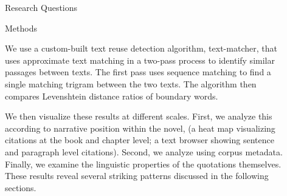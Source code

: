\documentclass[final]{beamer}
\newlength{\sepwid}
\newlength{\onecolwid}
\newlength{\twocolwid}
\begin{document}
\begin{frame}[t]
\begin{columns}[t]
\begin{column}{\onecolwid}
\begin{alertblock}{Research Questions}
\end{alertblock}


\begin{block}{Methods}

We use a custom-built text reuse detection algorithm, text-matcher, that uses approximate text matching in a two-pass process to identify similar passages between texts. The first pass uses sequence matching to find a single matching trigram between the two texts. The algorithm then compares Levenshtein  distance ratios of boundary words.\\

\vspace{10mm}

We then visualize these results at different scales. First, we analyze this according to narrative position within the novel, (a heat map visualizing citations at the book and chapter level; a text browser showing sentence and paragraph level citations). Second, we analyze using corpus metadata. Finally, we examine the linguistic properties of the quotations themselves. These results reveal several striking patterns discussed in the following sections.  


\end{block}






\end{column} %

\begin{column}{\sepwid}\end{column} %

\begin{column}{\twocolwid} %

\begin{columns}[t,totalwidth=\twocolwid] %

\begin{column}{\onecolwid}\vspace{-.6in} %


\end{column}
\end{columns}
\end{column}
\end{columns}
\end{frame}
\end{document}
